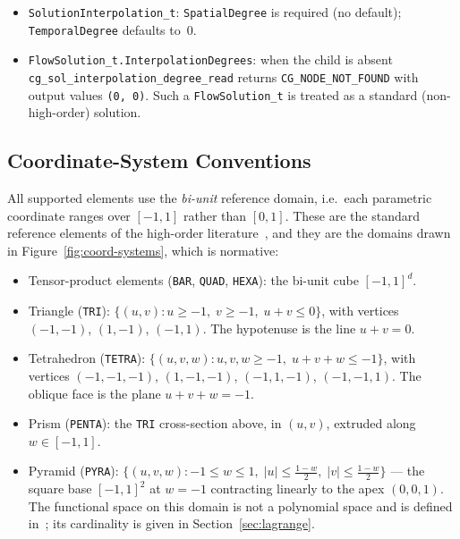 \documentclass[11pt,letterpaper]{article}
\begin{document}
{\sloppy
\begin{itemize}
  \item \texttt{SolutionInterpolation\_t}: \texttt{SpatialDegree} is required (no default);
    \texttt{TemporalDegree} defaults to~0.
  \item \texttt{FlowSolution\_t.InterpolationDegrees}: when the child is absent
    \texttt{cg\_sol\_interpolation\_degree\_read} returns \texttt{CG\_NODE\_NOT\_FOUND} with
    output values \texttt{(0, 0)}.  Such a \texttt{FlowSolution\_t} is treated as a standard
    (non-high-order) solution.
\end{itemize}
\par}

\subsection{Coordinate-System Conventions}
\label{sec:coord-conventions}

All supported elements use the \emph{bi-unit} reference domain, i.e.\ each parametric
coordinate ranges over $[-1, 1]$ rather than $[0, 1]$.  These are the standard reference
elements of the high-order literature~\cite{HW08}, and they are the domains drawn in
Figure~\ref{fig:coord-systems}, which is normative:

\begin{itemize}
  \item Tensor-product elements (\texttt{BAR}, \texttt{QUAD}, \texttt{HEXA}): the bi-unit
    cube $[-1, 1]^d$.
  \item Triangle (\texttt{TRI}): $\{(u,v) : u \ge -1,\; v \ge -1,\; u+v \le 0\}$, with
    vertices $(-1,-1)$, $(1,-1)$, $(-1,1)$.  The hypotenuse is the line $u+v = 0$.
  \item Tetrahedron (\texttt{TETRA}): $\{(u,v,w) : u,v,w \ge -1,\; u+v+w \le -1\}$, with
    vertices $(-1,-1,-1)$, $(1,-1,-1)$, $(-1,1,-1)$, $(-1,-1,1)$.  The oblique face is the
    plane $u+v+w = -1$.
  \item Prism (\texttt{PENTA}): the \texttt{TRI} cross-section above, in $(u,v)$, extruded
    along $w \in [-1, 1]$.
  \item Pyramid (\texttt{PYRA}): $\{(u,v,w) : -1 \le w \le 1,\;
    |u| \le \tfrac{1-w}{2},\; |v| \le \tfrac{1-w}{2}\}$ --- the square base
    $[-1,1]^2$ at $w = -1$ contracting linearly to the apex $(0,0,1)$.  The
    functional space on this domain is not a polynomial space and is defined
    in~\cite{BCD10}; its cardinality is given in Section~\ref{sec:lagrange}.
\end{itemize}
\end{document}
